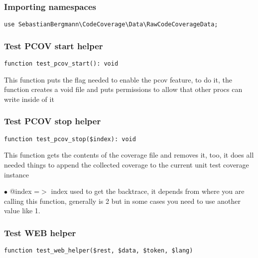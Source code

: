 \documentclass[a4paper]{article}
\begin{document}
\subsubsection{Importing namespaces}

\begin{lstlisting}
use SebastianBergmann\CodeCoverage\Data\RawCodeCoverageData;
\end{lstlisting}

\hypertarget{toc7}{}
\subsubsection{Test PCOV start helper}

\begin{lstlisting}
function test_pcov_start(): void
\end{lstlisting}

This function puts the flag needed to enable the pcov feature, to do it,
the function creates a void file and puts permissions to allow that other
procs can write inside of it

\hypertarget{toc8}{}
\subsubsection{Test PCOV stop helper}

\begin{lstlisting}
function test_pcov_stop($index): void
\end{lstlisting}

This function gets the contents of the coverage file and removes it, too,
it does all needed things to append the collected coverage to the current
unit test coverage instance

\begin{compactitem}
\item[\color{myblue}$\bullet$] @index =$>$ index used to get the backtrace, it depends from where you are
          calling this function, generally is 2 but in some cases you need
          to use another value like 1.
\end{compactitem}

\hypertarget{toc9}{}
\subsubsection{Test WEB helper}

\begin{lstlisting}
function test_web_helper($rest, $data, $token, $lang)
\end{lstlisting}
\end{document}

